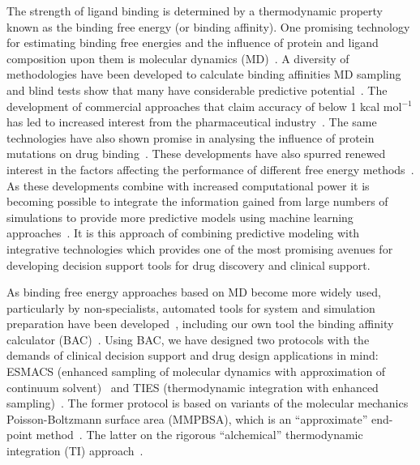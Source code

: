 The strength of ligand binding is determined by a thermodynamic property known
as the binding free energy (or binding affinity). 
One promising technology for
estimating binding free energies and the influence of protein and ligand
composition upon them is molecular dynamics (MD)~\cite{Karplus2005}. 
A diversity of methodologies have been developed to calculate binding affinities
MD sampling~\cite{Mobley2012} and blind tests show that many have considerable
predictive potential~\cite{Mey2017, Yin2017}.
The development of commercial approaches that claim accuracy of below 1 
kcal mol$^{-1}$
has led to increased interest from the 
pharmaceutical industry~\cite{Ganesan2017}.
The same technologies have also shown promise in analysing the influence of 
protein mutations on drug binding~\cite{Mondal2016, Bunney2015}.
These developments have also spurred renewed interest in the factors affecting 
the performance of different free energy 
methods~\cite{Aldeghi2017, Cappel2016, Ruiter2016}.
As these developments combine with increased computational power it is becoming 
possible to integrate the information gained from large numbers of simulations 
to provide more predictive models using machine learning 
approaches~\cite{Ash2017}. It is this approach of combining predictive modeling 
with integrative technologies which provides one of the most promising 
avenues for developing decision support tools for drug discovery and 
clinical support.

As binding free energy approaches based on MD become more widely used, 
particularly by non-specialists, automated tools for system and simulation 
preparation have been developed~\cite{Gapsys2015, Doerr2016, Rizzi}, including 
our own tool the binding affinity calculator (BAC)~\cite{Sadiq2008}.
Using BAC, we have designed two protocols
with the demands of clinical decision support and drug design applications in
mind: ESMACS (enhanced sampling of molecular dynamics with approximation of
continuum solvent)~\cite{Wan2017brd4} and TIES (thermodynamic integration with
enhanced sampling)~\cite{Bhati2017}. 
The former protocol is based on variants
of the molecular mechanics Poisson-Boltzmann surface area (MMPBSA), which is
an ``approximate'' end-point method~\cite{Massova1999}. 
The latter on the rigorous ``alchemical'' thermodynamic integration (TI)
approach~\cite{Straatsma1988}. 

